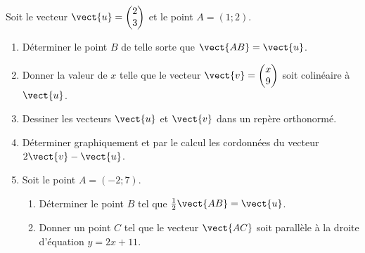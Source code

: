 
\begin{exercice}\label{exosmath-0061}

    Soit le vecteur \( \vect{ u }=\begin{pmatrix}
        2    \\ 
        3    
    \end{pmatrix}\) et le point \( A=(1;2)\).
    \begin{enumerate}
        \item
            Déterminer le point \( B\) de telle sorte que \( \vect{ AB }=\vect{ u }\).
        \item
            Donner la valeur de \( x\) telle que le vecteur \( \vect{ v }= \begin{pmatrix}
                x    \\ 
                9    
            \end{pmatrix}\) soit colinéaire à \( \vect{ u }\).
        \item
            Dessiner les vecteurs \( \vect{ u }\) et \( \vect{ v }\) dans un repère orthonormé.
        \item
            Déterminer graphiquement et par le calcul les cordonnées du vecteur \( 2\vect{ v }-\vect{ u }\).
        \item
            Soit le point \( A=(-2;7)\). 
            \begin{enumerate}
                \item
            Déterminer le point \( B\) tel que \( \frac{ 1 }{2}\vect{ AB }=\vect{ u }\).
        \item
            Donner un point \( C\) tel que le vecteur \( \vect{ AC }\) soit parallèle à la droite d'équation \( y=2x+11\).
            \end{enumerate}
    \end{enumerate}

\end{exercice}
